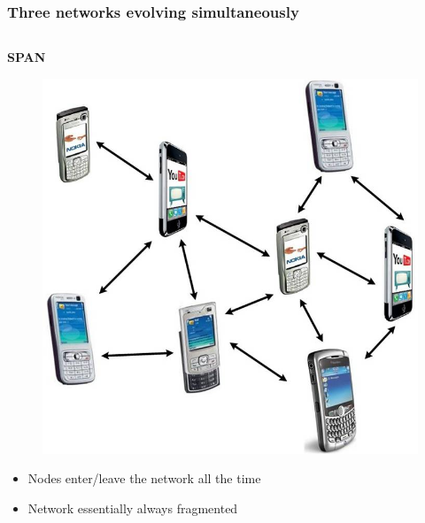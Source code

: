 \documentclass{beamer}
\begin{document}
\begin{frame}
	\frametitle{Three networks evolving simultaneously}

	\begin{columns}
		\begin{column}{0.3\textwidth}
			\centering
			\textbf{SPAN}
			\begin{figure}
				\includegraphics[width=\textwidth]{span.jpg}
			\end{figure}
			\begin{scriptsize}
				\begin{itemize}
					\item Nodes enter/leave the network all the time
					\item Network essentially always fragmented
				\end{itemize}
			\end{scriptsize}
		\end{column}

		\vrule{}


\end{columns}
\end{frame}
\end{document}
